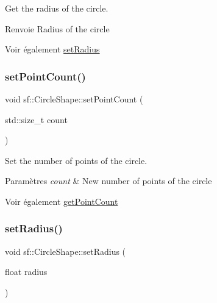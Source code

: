 Get the radius of the circle. 

\begin{DoxyReturn}{Renvoie}
Radius of the circle
\end{DoxyReturn}
\begin{DoxySeeAlso}{Voir également}
\hyperlink{classsf_1_1CircleShape_a21cdf85fc2f201e10222a241af864be0}{set\+Radius} 
\end{DoxySeeAlso}
\mbox{\label{classsf_1_1CircleShape_a16590ee7bdf5c9f752275468a4997bed}} 
\subsubsection{\texorpdfstring{set\+Point\+Count()}{setPointCount()}}
{\footnotesize\ttfamily void sf\+::\+Circle\+Shape\+::set\+Point\+Count (\begin{DoxyParamCaption}\item[{std\+::size\+\_\+t}]{count }\end{DoxyParamCaption})}



Set the number of points of the circle. 


\begin{DoxyParams}{Paramètres}
{\em count} & New number of points of the circle\\
\hline
\end{DoxyParams}
\begin{DoxySeeAlso}{Voir également}
\hyperlink{classsf_1_1CircleShape_a014d29ec11e8afa4dce50e7047d99601}{get\+Point\+Count} 
\end{DoxySeeAlso}
\mbox{\label{classsf_1_1CircleShape_a21cdf85fc2f201e10222a241af864be0}} 
\subsubsection{\texorpdfstring{set\+Radius()}{setRadius()}}
{\footnotesize\ttfamily void sf\+::\+Circle\+Shape\+::set\+Radius (\begin{DoxyParamCaption}\item[{float}]{radius }\end{DoxyParamCaption})}



